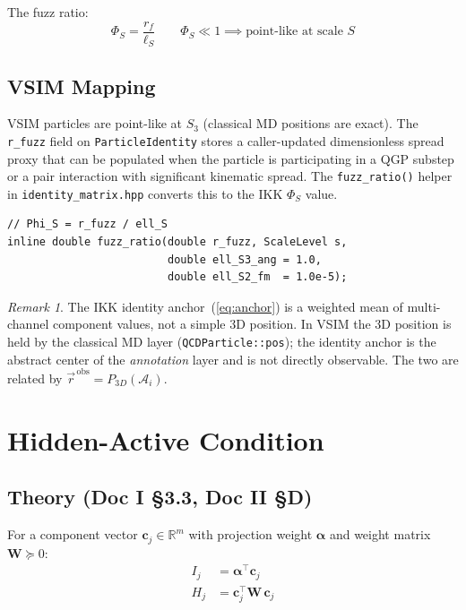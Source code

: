 \documentclass[11pt, a4paper, oneside]{article}
\newcommand{\Anch}{\mathcal{A}}
\theoremstyle{definition}
\theoremstyle{remark}
\newtheorem{remark}{Remark}[section]
\begin{document}
The fuzz ratio:
\begin{equation}
  \Phi_S = \frac{r_f}{\ell_S}
  \qquad
  \Phi_S \ll 1 \implies \text{point-like at scale } S
\end{equation}

\subsection{VSIM Mapping}

VSIM particles are point-like at $S_3$ (classical MD positions are exact).
The \texttt{r\_fuzz} field on \texttt{ParticleIdentity} stores a caller-updated
dimensionless spread proxy that can be populated when the particle is
participating in a QGP substep or a pair interaction with significant kinematic
spread.  The \texttt{fuzz\_ratio()} helper in \texttt{identity\_matrix.hpp}
converts this to the IKK $\Phi_S$ value.

\begin{lstlisting}[caption={fuzz\_ratio() in identity\_matrix.hpp}]
// Phi_S = r_fuzz / ell_S
inline double fuzz_ratio(double r_fuzz, ScaleLevel s,
						 double ell_S3_ang = 1.0,
						 double ell_S2_fm  = 1.0e-5);
\end{lstlisting}

\begin{remark}
  The IKK identity anchor~(\ref{eq:anchor}) is a weighted mean of multi-channel
  component values, not a simple 3D position.  In VSIM the 3D position is held
  by the classical MD layer (\texttt{QCDParticle::pos}); the identity anchor is
  the abstract center of the \emph{annotation} layer and is not directly
  observable.  The two are related by $\vec{r}^{\,\text{obs}} = P_{3D}(\Anch_i)$.
\end{remark}

\section{Hidden-Active Condition}

\subsection{Theory (Doc I \S3.3, Doc II \S D)}

For a component vector $\mathbf{c}_j \in \mathbb{R}^m$ with projection
weight $\bm{\alpha}$ and weight matrix $\mathbf{W} \succeq 0$:
\begin{align}
  I_j &= \bm{\alpha}^\top \mathbf{c}_j \label{eq:observable} \\
  H_j &= \mathbf{c}_j^\top \mathbf{W}\, \mathbf{c}_j \label{eq:hidden}
\end{align}
\end{document}
